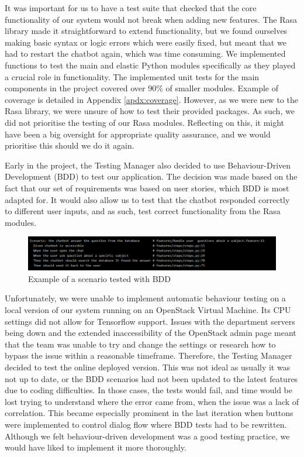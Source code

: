 \documentclass{l3proj}
\begin{document}
It was important for us to have a test suite that checked that the core functionality of our system would not break when adding new features. The Rasa library made it straightforward to extend functionality, but we found ourselves making basic syntax or logic errors which were easily fixed, but meant that we had to restart the chatbot again, which was time consuming. We implemented functions to test the main and elastic Python modules specifically as they played a crucial role in functionality. The implemented unit tests for the main components in the project covered over 90\% of smaller modules. Example of coverage is detailed in Appendix \ref{apdx:coverage}. However, as we were new to the Rasa library, we were unsure of how to test their provided packages. As such, we did not prioritise the testing of our Rasa modules. Reflecting on this, it might have been a big oversight for appropriate quality assurance, and we would prioritise this should we do it again.

Early in the project, the Testing Manager also decided to use Behaviour-Driven Development (BDD) to test our application. The decision was made based on the fact that our set of requirements was based on user stories, which BDD is most adapted for\cite{bdd:Goulart}. It would also allow us to test that the chatbot responded correctly to different user inputs, and as such, test correct functionality from the Rasa modules.

\begin{figure}[h!]
  \includegraphics[width=\linewidth]{figures/BDD.PNG}
  \caption{Example of a scenario tested with BDD}
\end{figure}

Unfortunately, we were unable to implement automatic behaviour testing on a local version of our system running on an OpenStack Virtual Machine. Its CPU settings did not allow for Tensorflow support. Issues with the department servers being down and the extended inaccessibility of the OpenStack admin page meant that the team was unable to try and change the settings or research how to bypass the issue within a reasonable timeframe. Therefore, the Testing Manager decided to test the online deployed version. This was not ideal as usually it was not up to date, or the BDD scenarios had not been updated to the latest features due to coding difficulties. In those cases, the tests would fail, and time would be lost trying to understand where the error came from, when the issue was a lack of correlation. This became especially prominent in the last iteration when buttons were implemented to control dialog flow where BDD tests had to be rewritten. Although we felt behaviour-driven development was a good testing practice, we would have liked to implement it more thoroughly.
\end{document}

